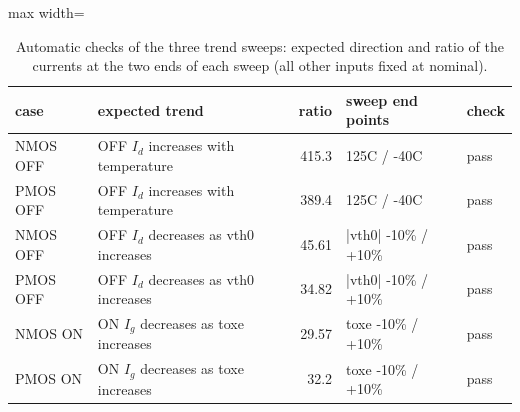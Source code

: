 \begin{table}[H]
\centering
{\small
\begin{adjustbox}{max width=\linewidth}
\begin{tabular}{llrll}
\toprule
case & expected trend & ratio & sweep end points & check \\
\midrule
NMOS OFF & OFF $I_d$ increases with temperature & 415.3 & 125C / -40C & pass \\
PMOS OFF & OFF $I_d$ increases with temperature & 389.4 & 125C / -40C & pass \\
NMOS OFF & OFF $I_d$ decreases as vth0 increases & 45.61 & |vth0| -10\% / +10\% & pass \\
PMOS OFF & OFF $I_d$ decreases as vth0 increases & 34.82 & |vth0| -10\% / +10\% & pass \\
NMOS ON & ON $I_g$ decreases as toxe increases & 29.57 & toxe -10\% / +10\% & pass \\
PMOS ON & ON $I_g$ decreases as toxe increases & 32.2 & toxe -10\% / +10\% & pass \\
\bottomrule
\end{tabular}
\end{adjustbox}
}
\caption{Automatic checks of the three trend sweeps: expected direction and ratio of the currents at the two ends of each sweep (all other inputs fixed at nominal).}
\label{tab:trends}
\end{table}

